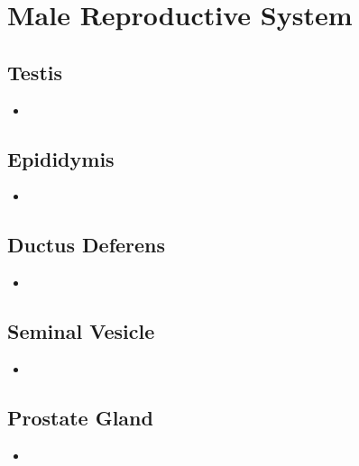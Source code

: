 \section{Male Reproductive System}

\subsection{Testis}
\begin{center}
\end{center}
\begin{itemize}
  \item 
\end{itemize}

\subsection{Epididymis}
\begin{center}
\end{center}
\begin{itemize}
  \item 
\end{itemize}

\subsection{Ductus Deferens}
\begin{center}
\end{center}
\begin{itemize}
  \item 
\end{itemize}

\subsection{Seminal Vesicle}
\begin{center}
\end{center}
\begin{itemize}
  \item 
\end{itemize}

\subsection{Prostate Gland}
\begin{center}
\end{center} 
\begin{itemize}
  \item 
\end{itemize}

